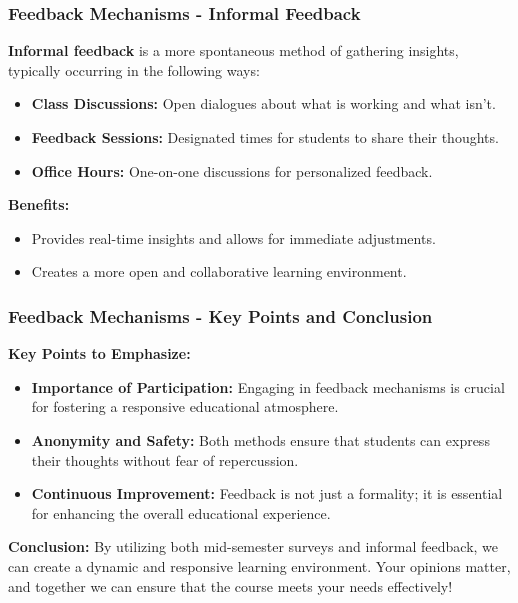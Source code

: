 \documentclass[aspectratio=169]{beamer}
\begin{document}
\begin{frame}[fragile]
    \frametitle{Feedback Mechanisms - Informal Feedback}
    \textbf{Informal feedback} is a more spontaneous method of gathering insights, typically occurring in the following ways:
    
    \begin{itemize}
        \item \textbf{Class Discussions:} Open dialogues about what is working and what isn’t.
        \item \textbf{Feedback Sessions:} Designated times for students to share their thoughts.
        \item \textbf{Office Hours:} One-on-one discussions for personalized feedback.
    \end{itemize}
    
    \textbf{Benefits:}
    \begin{itemize}
        \item Provides real-time insights and allows for immediate adjustments.
        \item Creates a more open and collaborative learning environment.
    \end{itemize}
\end{frame}

\begin{frame}[fragile]
    \frametitle{Feedback Mechanisms - Key Points and Conclusion}
    \textbf{Key Points to Emphasize:}
    \begin{itemize}
        \item \textbf{Importance of Participation:} Engaging in feedback mechanisms is crucial for fostering a responsive educational atmosphere.
        \item \textbf{Anonymity and Safety:} Both methods ensure that students can express their thoughts without fear of repercussion.
        \item \textbf{Continuous Improvement:} Feedback is not just a formality; it is essential for enhancing the overall educational experience.
    \end{itemize}
    
    \textbf{Conclusion:} By utilizing both mid-semester surveys and informal feedback, we can create a dynamic and responsive learning environment. Your opinions matter, and together we can ensure that the course meets your needs effectively!
\end{frame}
\end{document}
